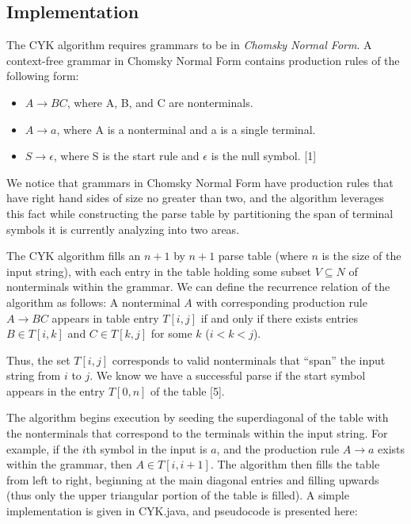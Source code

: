 \documentclass[a4paper, 11pt]{article}
\begin{document}
\subsection{Implementation}
The CYK algorithm requires grammars to be in \textit{Chomsky Normal Form}. A context-free grammar in Chomsky Normal Form contains production rules of the following form:

\begin{itemize}

\item $A \to B C$, where A, B, and C are nonterminals.
\item $A \to a$, where A is a nonterminal and a is a single terminal.
\item $S \to \epsilon$, where S is the start rule and $\epsilon$ is the null symbol. [1]

\end{itemize}

We notice that grammars in Chomsky Normal Form have production rules that have right hand sides of size no greater than two, and the algorithm leverages this fact while
constructing the parse table by partitioning the span of terminal symbols it is currently analyzing into two areas.

The CYK algorithm fills an $n+1$ by $n+1$ parse table (where $n$ is the size of the input string), with each entry in the table holding some subset 
$V \subseteq N$ of nonterminals
within the grammar. We can define the recurrence relation of the algorithm as follows: A nonterminal $A$ with corresponding production rule $A \to B C$ appears in table entry 
$T[i,j]$ if and only if there exists entries $B \in T[i,k]$ and $C \in T[k,j]$ for some $k$ ($i<k<j$).

\begin{center}  \end{center}

Thus, the set $T[i,j]$ corresponds to valid nonterminals that ``span'' the input string from $i$ to $j$. We know we have a successful parse if the start symbol appears in the
entry $T[0,n]$ of the table [5].

The algorithm begins execution by seeding the superdiagonal of the table with the nonterminals that correspond to the terminals within the input string. For example, if
the $i$th symbol in the input is $a$, and the production rule $A \to a$ exists within the grammar, then $A \in T[i,i+1]$. The algorithm then fills the table from left to right,
beginning at the main diagonal entries and filling upwards (thus only the upper triangular portion of the table is filled). A simple implementation is given in CYK.java, and
pseudocode is presented here:
\end{document}

